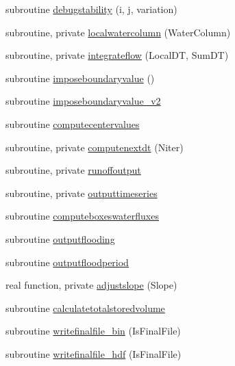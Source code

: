 \begin{DoxyCompactItemize}
subroutine \mbox{\hyperlink{namespacemodulerunoff_ad470166654c51ff37fe83cafeef5a424}{debugstability}} (i, j, variation)
\item 
subroutine, private \mbox{\hyperlink{namespacemodulerunoff_abd7df3c244fbd0c4171c796df0f50906}{localwatercolumn}} (Water\+Column)
\item 
subroutine, private \mbox{\hyperlink{namespacemodulerunoff_ad94c220c4dbba10ee5046785e9e782e9}{integrateflow}} (Local\+DT, Sum\+DT)
\item 
subroutine \mbox{\hyperlink{namespacemodulerunoff_a994fa95e6648fa412fa3e0982c2953e3}{imposeboundaryvalue}} ()
\item 
subroutine \mbox{\hyperlink{namespacemodulerunoff_acf9771f898b15e849b1eaba077dd0d83}{imposeboundaryvalue\+\_\+v2}}
\item 
subroutine \mbox{\hyperlink{namespacemodulerunoff_a922ce27a6758e75221357b9572099e5a}{computecentervalues}}
\item 
subroutine, private \mbox{\hyperlink{namespacemodulerunoff_a7e93c436177a4089e806a4f1fdeedc77}{computenextdt}} (Niter)
\item 
subroutine, private \mbox{\hyperlink{namespacemodulerunoff_af0c6bd2433c33b62204214405fa2bd23}{runoffoutput}}
\item 
subroutine, private \mbox{\hyperlink{namespacemodulerunoff_aaf5ac22ae6531f74c06c4596a878eaf9}{outputtimeseries}}
\item 
subroutine \mbox{\hyperlink{namespacemodulerunoff_a88ccc0aaa3ecf729db168b684f5b4801}{computeboxeswaterfluxes}}
\item 
subroutine \mbox{\hyperlink{namespacemodulerunoff_a61882209b1d8802763f9fb32a5f34a38}{outputflooding}}
\item 
subroutine \mbox{\hyperlink{namespacemodulerunoff_ad52912e124d2d30970fdc6d5bd8c15cc}{outputfloodperiod}}
\item 
real function, private \mbox{\hyperlink{namespacemodulerunoff_a5ac5c14875a2f0f2791e37f40b4321ea}{adjustslope}} (Slope)
\item 
subroutine \mbox{\hyperlink{namespacemodulerunoff_a341a4c8ef2509bc0f144f8afd17ece22}{calculatetotalstoredvolume}}
\item 
subroutine \mbox{\hyperlink{namespacemodulerunoff_a2f27139bf5cc235ef3e04522e63d2f5d}{writefinalfile\+\_\+bin}} (Is\+Final\+File)
\item 
subroutine \mbox{\hyperlink{namespacemodulerunoff_af0a5f9cb46a0d94efdb301f1b582b7c4}{writefinalfile\+\_\+hdf}} (Is\+Final\+File)
\item 

\end{DoxyCompactItemize}

